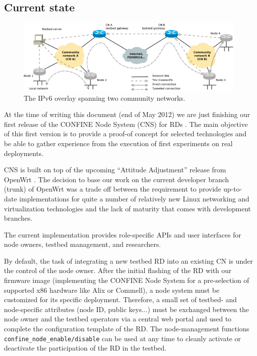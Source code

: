 \documentclass[conference]{IEEEtran}
\begin{document}
\subsection{Current state}

\begin{figure}[!t]
\centering
\includegraphics[height=0.20\textheight]{ipv6-overlay}
\caption{The IPv6 overlay spanning two community networks.}
\label{fig:ipv6-overlay}
\end{figure}






At the time of writing this document (end of May 2012) we are just
finishing our first release of the CONFINE Node System (CNS) for RDs
\cite{a-hack}. The main objective of this first version is to provide
a proof-of concept for selected technologies and be able to gather
experience from the execution of first experiments on real
deployments.

CNS is built on top of the upcoming ``Attitude Adjustment'' release
from OpenWrt \cite{attitudeAdjustment}. The decision to base our work
on the current developer branch (trunk) of OpenWrt was a trade off
between the requirement to provide up-to-date implementations for
quite a number of relatively new Linux networking and virtualization
technologies and the lack of maturity that comes with development
branches. 

The current implementation provides role-specific APIs and user
interfaces for node owners, testbed management, and researchers.

By default, the task of integrating a new testbed RD into an existing
CN is under the control of the node owner.  After the initial flashing
of the RD with our firmware image (implementing the CONFINE Node
System for a pre-selection of supported x86 hardware like Alix or
Commell), a node system must be customized for its specific deployment.
Therefore, a small set of testbed- and node-specific attributes
(node ID, public keys...) must be exchanged between the node owner
and the testbed operators via a central web portal and used to
complete the configuration template of the RD.  The
node-management functions \texttt{confine\_node\_enable/disable} can be used at
any time to cleanly activate or deactivate the participation of the RD
in the testbed.
\end{document}
